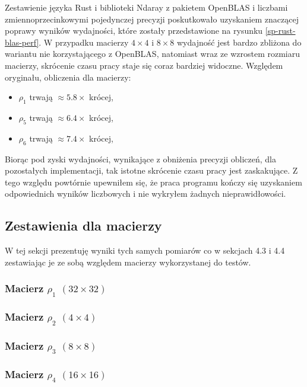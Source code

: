 \documentclass[11pt, a4paper]{article}
\begin{document}
\begin{sloppypar}
    Zestawienie języka Rust i biblioteki Ndaray z pakietem OpenBLAS i liczbami zmiennoprzecinkowymi
    pojedynczej precyzji poskutkowało uzyskaniem znaczącej poprawy wyników wydajności,
    które zostały przedstawione na rysunku \ref{sp-rust-blas-perf}. W przypadku macierzy
    $4\times4$ i $8\times8$ wydajność jest bardzo zbliżona do wariantu nie korzystającego
    z OpenBLAS, natomiast wraz ze wzrostem rozmiaru macierzy, skrócenie czasu pracy staje
    się coraz bardziej widoczne. Względem oryginału, obliczenia dla macierzy:
    \begin{itemize}
      \item $\rho_{1}$ trwają $\approx 5.8\times$ krócej,

      \item $\rho_{5}$ trwają $\approx 6.4\times$ krócej,

      \item $\rho_{6}$ trwają $\approx 7.4\times$ krócej,
    \end{itemize}
    Biorąc pod zyski wydajności, wynikające z obniżenia precyzji obliczeń, dla
    pozostałych implementacji, tak istotne skrócenie czasu pracy jest zaskakujące. Z
    tego względu powtórnie upewniłem się, że praca programu kończy się uzyskaniem odpowiednich
    wyników liczbowych i nie wykryłem żadnych nieprawidłowości.

    \subsection{Zestawienia dla macierzy}
    W tej sekcji prezentuję wyniki tych samych pomiarów co w sekcjach 4.3 i 4.4 zestawiając
    je ze sobą względem macierzy wykorzystanej do testów.

    \subsubsection{Macierz $\rho_{1}$ $(32\times32)$}


    \subsubsection{Macierz $\rho_{2}$ $(4\times4)$}


    \subsubsection{Macierz $\rho_{3}$ $(8\times8)$}


    \subsubsection{Macierz $\rho_{4}$ $(16\times16)$}



\end{sloppypar}
\end{document}
